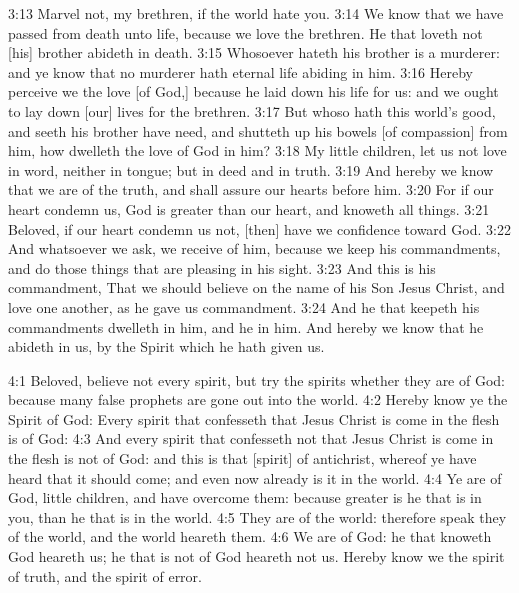    {3:13} Marvel not, my brethren, if the world hate you. {3:14} We
know that we have passed from death unto life, because we love the
brethren. He that loveth not [his] brother abideth in death. {3:15}
Whosoever hateth his brother is a murderer: and ye know that no
murderer hath eternal life abiding in him. {3:16} Hereby perceive we
the love [of God,] because he laid down his life for us: and we ought
to lay down [our] lives for the brethren. {3:17} But whoso hath this
world's good, and seeth his brother have need, and shutteth up his
bowels [of compassion] from him, how dwelleth the love of God in him?
{3:18} My little children, let us not love in word, neither in tongue;
but in deed and in truth. {3:19} And hereby we know that we are of the
truth, and shall assure our hearts before him. {3:20} For if our heart
condemn us, God is greater than our heart, and knoweth all things.
{3:21} Beloved, if our heart condemn us not, [then] have we confidence
toward God. {3:22} And whatsoever we ask, we receive of him, because we
keep his commandments, and do those things that are pleasing in his
sight. {3:23} And this is his commandment, That we should believe on
the name of his Son Jesus Christ, and love one another, as he gave us
commandment. {3:24} And he that keepeth his commandments dwelleth in
him, and he in him. And hereby we know that he abideth in us, by the
Spirit which he hath given us.

   {4:1} Beloved, believe not every spirit, but try the spirits whether
they are of God: because many false prophets are gone out into the
world. {4:2} Hereby know ye the Spirit of God: Every spirit that
confesseth that Jesus Christ is come in the flesh is of God: {4:3} And
every spirit that confesseth not that Jesus Christ is come in the flesh
is not of God: and this is that [spirit] of antichrist, whereof ye have
heard that it should come; and even now already is it in the world.
{4:4} Ye are of God, little children, and have overcome them: because
greater is he that is in you, than he that is in the world. {4:5} They
are of the world: therefore speak they of the world, and the world
heareth them. {4:6} We are of God: he that knoweth God heareth us; he
that is not of God heareth not us. Hereby know we the spirit of truth,
and the spirit of error.

